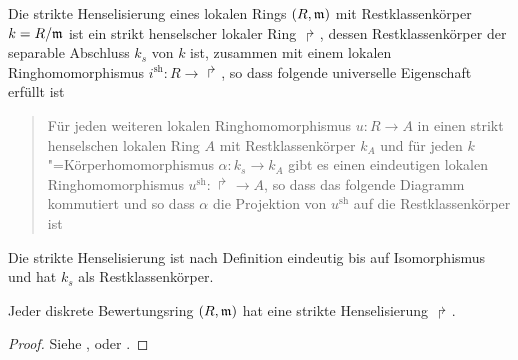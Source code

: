 
\begin{Definition}\label{def:striktehenselisierung}
  Die strikte Henselisierung eines lokalen Rings $(R,\mathfrak{m})$ mit
  Restklassenkörper $k=R/\mathfrak{m}$ ist ein strikt henselscher lokaler Ring
  $\Rsh$, dessen Restklassenkörper der separable Abschluss $k_s$ von
  $k$ ist, zusammen mit einem lokalen Ringhomomorphismus
  ${i^\text{sh}\colon R\to\Rsh}$, so dass folgende universelle
  Eigenschaft erfüllt ist
  \begin{quote}
    Für jeden weiteren lokalen Ringhomomorphismus $u\colon R\to A$ in
    einen strikt henselschen lokalen Ring $A$ mit Restklassenkörper
    $k_A$ und für jeden $k$"=Körperhomomorphismus $\alpha\colon k_s\to k_A$
    gibt es einen eindeutigen lokalen Ringhomomorphismus
    ${u^\text{sh}\colon\Rsh\to A}$, so dass das folgende Diagramm
    kommutiert und so dass $\alpha$ die Projektion von $u^\text{sh}$
    auf die Restklassenkörper ist
    \begin{center}
    \end{center}
  \end{quote}
  Die strikte Henselisierung ist nach Definition eindeutig bis auf
  Isomorphismus und hat $k_s$ als Restklassenkörper.
\end{Definition}

\begin{Satz}
  \label{thm:exhenselisierung}
  Jeder diskrete Bewertungsring $(R,\mathfrak{m})$ hat eine
  strikte Henselisierung $\Rsh$.
  \begin{proof}
    Siehe
    \cite[Proposition~IV.6.5]{silverman2},
    \cite[Remark~IV.6.6.2]{silverman2}
    oder \cite[Chapter~2.3, S.\,48]{neron}.
  \end{proof}
\end{Satz}

